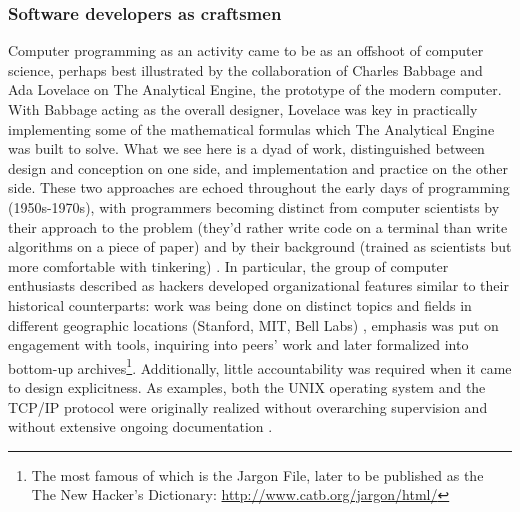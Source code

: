 \subsubsection{Software developers as craftsmen}
\label{subsubsec:software-craftsmen}

Computer programming as an activity came to be as an offshoot of computer science, perhaps best illustrated by the collaboration of Charles Babbage and Ada Lovelace on The Analytical Engine, the prototype of the modern computer. With Babbage acting as the overall designer, Lovelace was key in practically implementing some of the mathematical formulas which The Analytical Engine was built to solve. What we see here is a dyad of work, distinguished between design and conception on one side, and implementation and practice on the other side. These two approaches are echoed throughout the early days of programming (1950s-1970s), with programmers becoming distinct from computer scientists by their approach to the problem (they'd rather write code on a terminal than write algorithms on a piece of paper) and by their background (trained as scientists but more comfortable with tinkering) \citep{ensmenger_computer_2012}. In particular, the group of computer enthusiasts described as hackers developed organizational features similar to their historical counterparts: work was being done on distinct topics and fields in different geographic locations (Stanford, MIT, Bell Labs) \citep{raymond_cathedral_2001}, emphasis was put on engagement with tools, inquiring into peers' work \citep{levy_hackers_2010} and later formalized into bottom-up archives\footnote{The most famous of which is the Jargon File, later to be published as the The New Hacker's Dictionary: \url{http://www.catb.org/jargon/html/}}. Additionally, little accountability was required when it came to design explicitness. As examples, both the UNIX operating system and the TCP/IP protocol were originally realized without overarching supervision and without extensive ongoing documentation \citep{seibel_coders_2009,raymond_cathedral_2001}.

